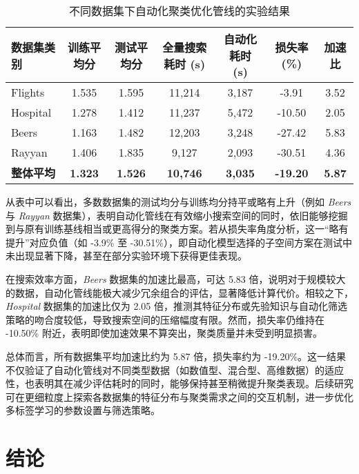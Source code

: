 \documentclass[10pt]{article} %
\numberwithin{equation}{section}
\begin{document}
\begin{table}[htbp]
\centering
\small
\setlength{\tabcolsep}{6pt}
\renewcommand{\arraystretch}{1.1}
\begin{tabular}{lcccccc}
\toprule
\textbf{数据集类别} & \textbf{训练平均分} & \textbf{测试平均分} & \textbf{全量搜索耗时 (s)} & \textbf{自动化耗时 (s)} & \textbf{损失率 (\%)} & \textbf{加速比} \\
\midrule
Flights  & 1.535  & 1.595  & 11,214  & 3,187  & -3.91  & 3.52 \\
Hospital & 1.278  & 1.412  & 11,237  & 5,472  & -10.50 & 2.05 \\
Beers    & 1.163  & 1.482  & 12,203  & 3,248  & -27.42 & 5.83 \\
Rayyan   & 1.406  & 1.835  & 9,127   & 2,093  & -30.51 & 4.36 \\
\midrule
\textbf{整体平均} & \textbf{1.323}  & \textbf{1.526}  & \textbf{10,746}  & \textbf{3,035}  & \textbf{-19.20}  & \textbf{5.87} \\
\bottomrule
\end{tabular}
\caption{不同数据集下自动化聚类优化管线的实验结果}
\label{tab:autoML_res_new}
\end{table}


从表中可以看出，多数数据集的测试均分与训练均分持平或略有上升（例如 \textit{Beers} 与 \textit{Rayyan} 数据集），表明自动化管线在有效缩小搜索空间的同时，依旧能够挖掘到与原有训练基线相当或更高得分的聚类方案。若从损失率角度分析，这一“略有提升”对应负值（如 -3.9\% 至 -30.51\%），即自动化模型选择的子空间方案在测试中未出现显著下降，甚至在部分实验环境下获得更佳表现。

在搜索效率方面，\textit{Beers} 数据集的加速比最高，可达 5.83 倍，说明对于规模较大的数据，自动化管线能极大减少冗余组合的评估，显著降低计算代价。相较之下，\textit{Hospital} 数据集的加速比仅为 2.05 倍，推测其特征分布或先验知识与自动化筛选策略的吻合度较低，导致搜索空间的压缩幅度有限。然而，损失率仍维持在 -10.50\% 附近，表明即使加速效果不算突出，聚类质量并未受到明显损害。

总体而言，所有数据集平均加速比约为 5.87 倍，损失率约为 -19.20\%。这一结果不仅验证了自动化管线对不同类型数据（如数值型、混合型、高维数据）的适应性，也表明其在减少评估耗时的同时，能够保持甚至稍微提升聚类表现。后续研究可在更细粒度上探索各数据集的特征分布与聚类需求之间的交互机制，进一步优化多标签学习的参数设置与筛选策略。


\section{结论}
\label{sec:conclusion}
\end{document}
